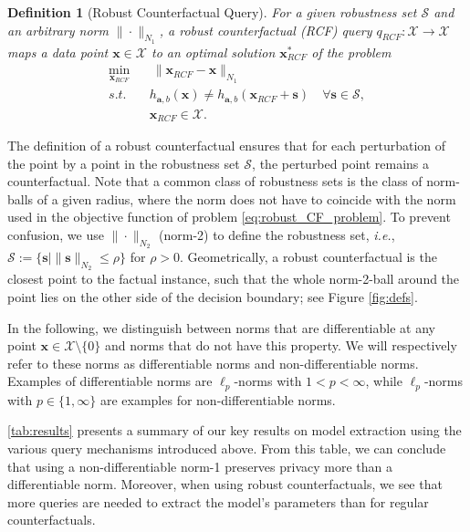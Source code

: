 \documentclass{article}
\newtheorem{definition}[theorem]{Definition}
\begin{document}
\begin{definition}[Robust Counterfactual Query]
For a given robustness set $\mathcal S$ and an arbitrary norm  $\| \cdot \|_{N_1}$, a robust counterfactual (RCF) query $q_{RCF}:\mathcal{X}\rightarrow\mathcal{X}$ maps a data point $\bm{x}\in \mathcal{X}$ to an optimal solution $\bm{x}_{RCF}^*$ of the problem
\begin{equation}\label{eq:robust_CF_problem}
\begin{aligned}
    \min_{\bm{x}_{RCF}} & \ \| \bm{x}_{RCF}-\bm{x}\|_{N_1} \\
    s.t. \quad & h_{\bm{a},b}(\bm{x})\neq h_{\bm{a},b} (\bm{x}_{RCF} + \bm{s}) \quad \forall \bm{s}\in\mathcal S, \\
    & \bm{x}_{RCF}\in \mathcal X.
\end{aligned}
\end{equation}
\end{definition}
The definition of a robust counterfactual ensures that for each perturbation of the point by a point in the robustness set $\mathcal S$, the perturbed point remains a counterfactual. Note that a common class of robustness sets is the class of norm-balls of a given radius, where the norm does not have to coincide with the norm used in the objective function of problem \eqref{eq:robust_CF_problem}. To prevent confusion, we use $\|\cdot\|_{N_2}$ (norm-2) to define the robustness set, \textit{i.e.}, $\mathcal S:=\{\bm{s}\mid \|\bm{s}\|_{N_2}\leq \rho\}$ for $\rho>0$. Geometrically, a robust counterfactual is the closest point to the factual instance, such that the whole norm-2-ball around the point lies on the other side of the decision boundary; see Figure \ref{fig:defs}.

In the following, we distinguish between norms that are differentiable at any point $\bm{x}\in\mathcal{X}\setminus\{0\}$ and norms that do not have this property. We will respectively refer to these norms as differentiable norms and non-differentiable norms. Examples of differentiable norms are $\ell_p$-norms with $1<p<\infty$, while $\ell_p$-norms with $p\in \{ 1,\infty\}$ are examples for non-differentiable norms. 

\cref{tab:results} presents a summary of our key results on model extraction using the various query mechanisms introduced above. From this table, we can conclude that using a non-differentiable norm-1 preserves privacy more than a differentiable norm. Moreover, when using robust counterfactuals, we see that more queries are needed to extract the model's parameters than for regular counterfactuals. 
\end{document}
